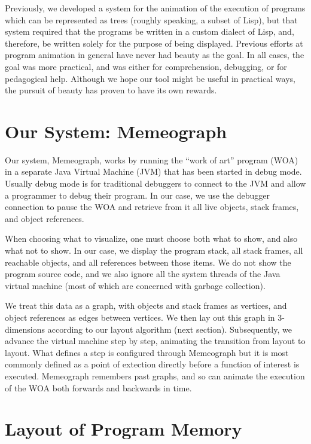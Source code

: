 \documentclass[11pt]{article}
\begin{document}
Previously, we developed a system for the animation of the execution of
programs which can be represented as trees (roughly speaking, a subset of
Lisp)\cite{boca}, but that system required that the programs be written in a
custom dialect of Lisp, and, therefore, be written solely for the purpose of
being displayed.  Previous efforts at program animation in general have never
had beauty as the goal.  In all cases, the goal was more practical, and was
either for comprehension, debugging, or for pedagogical help.  Although we hope
our tool might be useful in practical ways, the pursuit of beauty has proven to
have its own rewards.

\section{Our System: Memeograph}

Our system, Memeograph, works by running the ``work of art'' program (WOA) in
a separate Java Virtual Machine (JVM) that has been started in debug mode.
Usually debug mode is for traditional debuggers to connect to the JVM and allow
a programmer to debug their program. In our case, we use the debugger
connection to pause the WOA and retrieve from it all live objects, stack
frames, and object references.

When choosing what to visualize, one must choose both what to show, and also
what not to show.  In our case, we display the program stack, all stack frames,
all reachable objects, and all references between those items.  We do not
show the program source code, and we also ignore all the system threads of the
Java virtual machine (most of which are concerned with garbage collection).

We treat this data as a graph, with objects and stack frames as vertices, and
object references as edges between vertices.  We then lay out this graph in
3-dimensions according to our layout algorithm (next section).  Subsequently,
we advance the virtual machine step by step, animating the transition from
layout to layout. What defines a step is configured through Memeograph but it
is most commonly defined as a point of extection directly before a function of interest
is executed. Memeograph remembers past graphs, and so can animate the execution of the WOA
both forwards and backwards in time.

\section{Layout of Program Memory}
\label{sec:layout}
\end{document}
